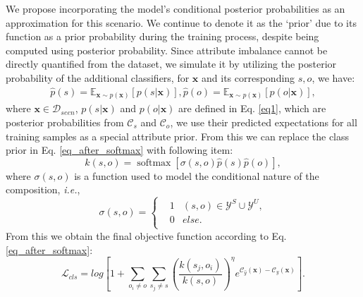 \documentclass[letterpaper]{article} %
\newcommand{\mx}{\mathbf{x}}
\newcommand{\ie}{\textit{i.e.}}
\theoremstyle{definition}
\begin{document}
We propose incorporating the model's conditional posterior probabilities as an approximation for this scenario. We continue to denote it as the `prior' due to its function as a prior probability during the training process, despite being computed using posterior probability. Since attribute imbalance cannot be directly quantified from the dataset, we simulate it by utilizing the posterior probability of the additional classifiers, for $\mx$ and its corresponding $s,o$, we have:
	\begin{equation}
 	\begin{split}
    \hat{p}(s) = \mathbb{E}_{\mx\sim p(\mx)}[p(s|\mx)],
    \hat{p}(o) = \mathbb{E}_{\mx\sim p(\mx)}[p(o|\mx)],
        \label{eq_estimate}
        \end{split}
	\end{equation}
where $\mx \in \mathcal{D}_{seen}$, $p(s|\mx)$ and $p(o|\mx)$ are defined in Eq. \ref{eq1}, which are posterior probabilities from $\mathcal{C}_{s}$ and $\mathcal{C}_{o}$, we use their predicted expectations for all training samples as a special attribute prior. From this we can replace the class prior in Eq. \ref{eq_after_softmax} with following item:
	\begin{equation}
k(s,o)= \operatorname{softmax}\left[ \sigma(s,o)\hat{p}(s)\hat{p}(o)\right ],
        \label{eq_final_sigma_introduce}
	\end{equation}
where $\sigma(s,o)$ is a function used to model the conditional nature of the composition, \ie,
 \begin{equation}\label{eq_onehot}
\sigma(s,o)=\left\{
\begin{array}{rcl}
&1& (s,o) \in \mathcal{Y}^{S}\cup \mathcal{Y}^{U},\\
&0 &else.\\
\end{array} \right.
\end{equation}
From this we obtain the final objective function according to Eq. \ref{eq_after_softmax}:
 	\begin{equation}
\mathcal{L}_{cls}= log \left [1+\sum_{o_i\neq o}\sum_{s_j \neq s}\left (\frac{k(s_j,o_i)}{k(s,o)} \right )^{\eta}e^{ \mathcal{C}_{\hat{y}}(\mx)- \mathcal{C}_{y}(\mx)}\right ].
        \label{eq_final_after_softmax}
	\end{equation}
\end{document}
